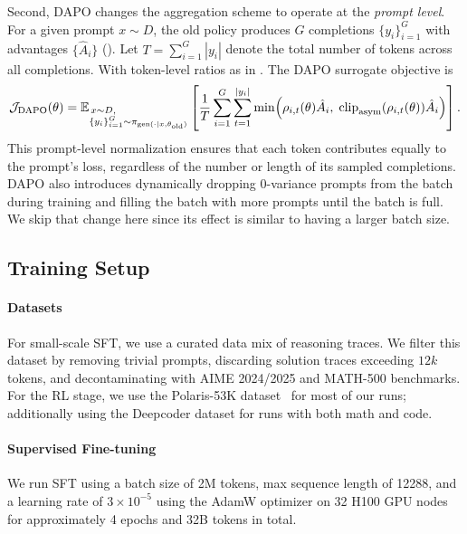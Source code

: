 \documentclass[]{fairmeta} %
\begin{document}
Second, DAPO changes the aggregation scheme to operate at the \emph{prompt level}.  
For a given prompt $x \sim D$, the old policy produces $G$ completions $\{y_i\}_{i=1}^G$ with advantages $\{\hat{A}_i\}$ ().  
Let $T = \sum_{i=1}^G |y_i|$ denote the total number of tokens across all completions.  
With token-level ratios as in .
The DAPO surrogate objective is
\begin{equation}
\mathcal{J}_{\mathrm{DAPO}}(\theta) 
= \mathbb{E}_{\begin{subarray}{l} \, x \sim D, \\ \{y_i\}_{i=1}^G \sim \pi_{\text{gen}(\cdot \mid x, \theta_{\text{old}})} \end{subarray}}
\left[ \frac{1}{T} \sum_{i=1}^G \sum_{t=1}^{|y_i|}
\min\!\left( \rho_{i,t}(\theta)\hat{A}_i,\; \mathrm{clip}_{\mathrm{asym}}(\rho_{i,t}(\theta))\hat{A}_i \right) \right]. \label{eq:dapo_loss}
\end{equation}
This prompt-level normalization ensures that each token contributes equally to the prompt's loss, regardless of the number or length of its sampled completions.
DAPO also introduces dynamically dropping 0-variance prompts from the batch during training and filling the batch with more prompts until the batch is full. We skip that change here since its effect is similar to having a larger batch size.


\subsection{Training Setup}\label{appendix:setup}

\paragraph{Datasets}
For small-scale SFT, we use a curated data mix of reasoning traces. 
We filter this dataset by removing trivial prompts, discarding solution traces exceeding $12k$ tokens, and decontaminating with AIME 2024/2025 \citep{aime} and MATH-500 \citep{hendrycks2021measuring} benchmarks. For the RL stage, we use the Polaris-53K dataset~\citep{polaris2025} for most of our runs; additionally using the Deepcoder dataset \citep{deepcoder2025} for runs with both math and code.

\paragraph{Supervised Fine-tuning}
We run SFT using a batch size of 2M tokens, max sequence length of 12288, and a learning rate of $3 \times 10^{-5}$ using the AdamW optimizer \citep{adamw} on 32 H100 GPU nodes for approximately 4 epochs and 32B tokens in total.
\end{document}

